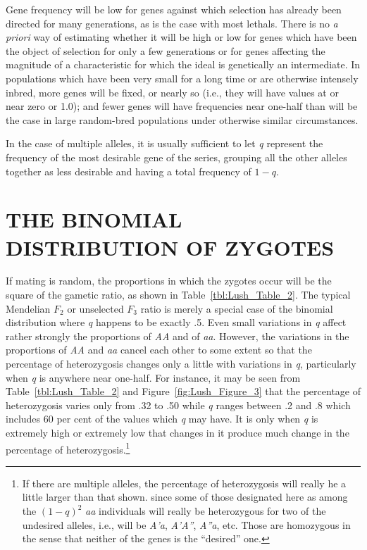 Gene frequency will be low for genes against which selection has
already been directed for many generations, as is the case with most
lethals. There is no \textit{a priori} way of estimating whether it will
be high or low for genes which have been the object of selection for only
a few generations or for genes affecting the magnitude of a characteristic
for which the ideal is genetically an intermediate. In populations which
have been very small for a long time or are otherwise intensely inbred,
more genes will be fixed, or nearly so (i.e., they will have values at or
near zero or 1.0); and fewer genes will have frequencies near one-half
than will be the case in large random-bred populations under otherwise
similar circumstances.

In the case of multiple alleles, it is usually sufficient to let \textit{q}
represent the frequency of the most desirable gene of the series, grouping
all the other alleles together as less desirable and having a total frequency
of $1 - q$.

\section*{THE BINOMIAL DISTRIBUTION OF ZYGOTES}

If mating is random, the proportions in which the zygotes occur will
be the square of the gametic ratio, as shown in Table~\ref{tbl:Lush_Table_2}.
The typical Mendelian $F_2$ or unselected $F_3$ ratio is merely a special case
of the binomial distribution where \textit{q} happens to be exactly .5. Even small
variations in \textit{q} affect rather strongly the proportions of \textit{AA} and
of \textit{aa}. However, the variations in the proportions of \textit{AA} and
\textit{aa} cancel each other to some extent so that the percentage of heterozygosis
changes only a little with variations in \textit{q}, particularly when \textit{q}
is anywhere near one-half. For instance, it may be seen from Table~\ref{tbl:Lush_Table_2}
and Figure~\ref{fig:Lush_Figure_3} that the percentage of heterozygosis varies only from
.32 to .50 while \textit{q} ranges between .2 and .8 which includes 60 per cent of the
values which \textit{q} may have. It is only when \textit{q} is extremely high or
extremely low that changes in it produce much change in the percentage of
heterozygosis.\footnote{If there are multiple alleles, the percentage of heterozygosis
will really he a little larger than that shown. since some of those designated here as among
the $(1-q)^2$ \textit{aa} individuals will really be heterozygous for two of the undesired
alleles, i.e., will be \textit{A'a}, \textit{A'A''}, \textit{A''a}, etc. Those are homozygous in
the sense that neither of the genes is the ``desired'' one.}

